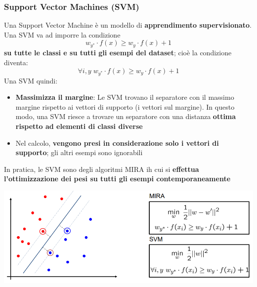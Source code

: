 \documentclass[12pt]{article}
\begin{document}
\subsubsection{Support Vector Machines (SVM)}
Una Support Vector Machine è un modello di \textbf{apprendimento supervisionato}. Una SVM va ad imporre la condizione
$$w_{y^*} \cdot f(x) \geq w_y \cdot f(x) + 1$$
\textbf{su tutte le classi e su tutti gli esempi del dataset}; cioè la condizione diventa:
$$\forall i, y \; w_{y^*} \cdot f(x) \geq w_y \cdot f(x) + 1$$
Una SVM quindi:
\begin{itemize}
    \item \textbf{Massimizza il margine}: Le SVM trovano il separatore con il massimo margine rispetto ai vettori di supporto (i vettori sul margine). In questo modo, una SVM riesce a trovare un separatore con una distanza \textbf{ottima rispetto ad elementi di classi diverse}
    \item Nel calcolo, \textbf{vengono presi in considerazione solo i vettori di supporto}; gli altri esempi sono ignorabili
\end{itemize}
In pratica, le SVM sono degli algoritmi MIRA ih cui si \textbf{effettua l'ottimizzazione dei pesi su tutti gli esempi contemporaneamente}
\begin{center}
    \includegraphics[width =0.90\linewidth]{Images/105.PNG}
\end{center}
\end{document}
